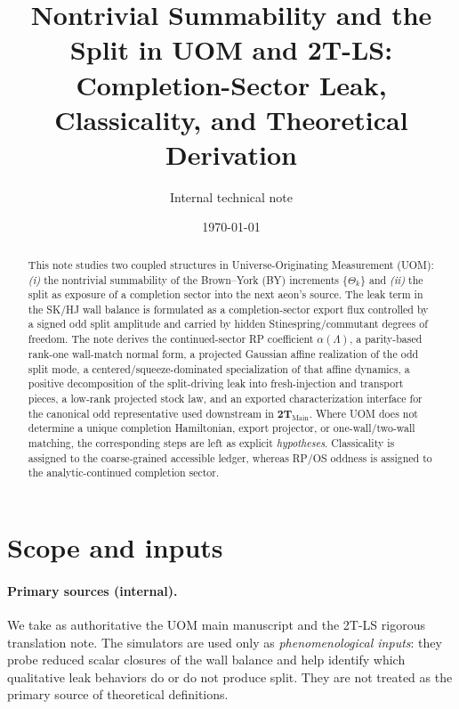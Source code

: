 \documentclass[11pt]{article}
\title{Nontrivial Summability and the Split in UOM and 2T-LS:\\
Completion-Sector Leak, Classicality, and Theoretical Derivation}
\author{Internal technical note}
\date{\today}
\theoremstyle{definition}
\theoremstyle{plain}
\theoremstyle{remark}
\begin{document}
\maketitle

\begin{abstract}
This note studies two coupled structures in Universe-Originating Measurement (UOM):
\emph{(i)} the nontrivial summability of the Brown--York (BY) increments $\{\Theta_k\}$ and
\emph{(ii)} the split as exposure of a completion sector into the next aeon's source.
The leak term in the SK/HJ wall balance is formulated as a completion-sector export flux
controlled by a signed odd split amplitude and carried by hidden Stinespring/commutant degrees of
freedom.
The note derives the continued-sector RP coefficient \(\alpha(\Lambda)\), a parity-based rank-one
wall-match normal form, a projected Gaussian affine realization of the odd split mode, a
centered/squeeze-dominated specialization of that affine dynamics, a positive decomposition of the
split-driving leak into fresh-injection and transport pieces, a low-rank projected stock law, and
an exported characterization interface for the canonical odd representative used downstream in
\(\mathbf{2T}_{\mathrm{Main}}\).
Where UOM does not determine a unique completion Hamiltonian, export projector, or one-wall/two-wall
matching, the corresponding steps are left as explicit \emph{hypotheses}.
Classicality is assigned to the coarse-grained accessible ledger, whereas RP/OS oddness is assigned
to the analytic-continued completion sector.
\end{abstract}

\tableofcontents

\section{Scope and inputs}
\label{sec:scope}

\paragraph{Primary sources (internal).}
We take as authoritative the UOM main manuscript and the 2T-LS rigorous translation note.
The simulators are used only as \emph{phenomenological inputs}: they probe reduced scalar closures of the wall balance and
help identify which qualitative leak behaviors do or do not produce split.
They are not treated as the primary source of theoretical definitions.
\end{document}

